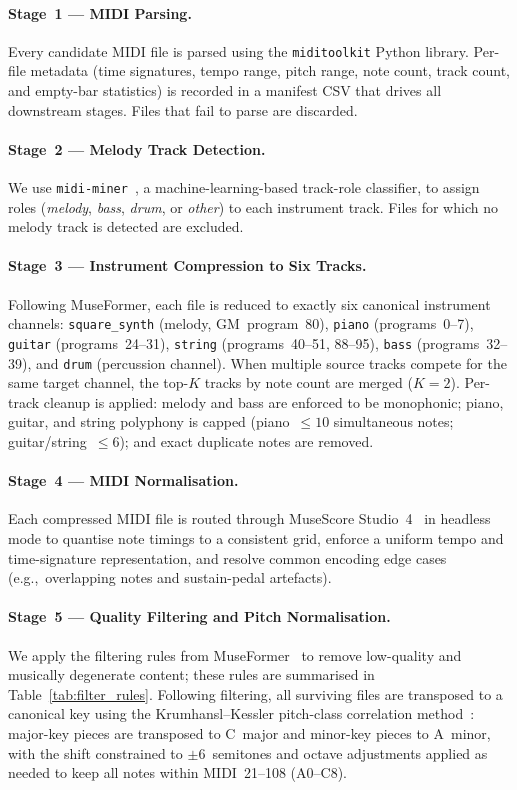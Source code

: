 \documentclass[conference]{IEEEtran}
\begin{document}
\paragraph{Stage~1 --- MIDI Parsing.}
Every candidate MIDI file is parsed using the \texttt{miditoolkit} Python library.
Per-file metadata (time signatures, tempo range, pitch range, note count, track count,
and empty-bar statistics) is recorded in a manifest CSV that drives all downstream
stages. Files that fail to parse are discarded.

\paragraph{Stage~2 --- Melody Track Detection.}
We use \texttt{midi-miner}~\cite{midiminer}, a machine-learning-based track-role
classifier, to assign roles (\emph{melody}, \emph{bass}, \emph{drum}, or
\emph{other}) to each instrument track.
Files for which no melody track is detected are excluded.

\paragraph{Stage~3 --- Instrument Compression to Six Tracks.}
Following MuseFormer, each file is reduced to exactly six canonical instrument
channels: \texttt{square\_synth} (melody, GM~program~80),
\texttt{piano} (programs~0--7), \texttt{guitar} (programs~24--31),
\texttt{string} (programs~40--51, 88--95), \texttt{bass} (programs~32--39),
and \texttt{drum} (percussion channel).
When multiple source tracks compete for the same target channel, the top-$K$ tracks
by note count are merged ($K{=}2$).
Per-track cleanup is applied: melody and bass are enforced to be monophonic; piano,
guitar, and string polyphony is capped (piano~$\leq 10$ simultaneous notes;
guitar/string~$\leq 6$); and exact duplicate notes are removed.

\paragraph{Stage~4 --- MIDI Normalisation.}
Each compressed MIDI file is routed through MuseScore Studio~4~\cite{musescore}
in headless mode to quantise note timings to a consistent grid, enforce a uniform
tempo and time-signature representation, and resolve common encoding edge cases
(e.g.,~overlapping notes and sustain-pedal artefacts).

\paragraph{Stage~5 --- Quality Filtering and Pitch Normalisation.}
We apply the filtering rules from MuseFormer~\cite{yu2022museformer} to remove
low-quality and musically degenerate content; these rules are summarised in
Table~\ref{tab:filter_rules}.
Following filtering, all surviving files are transposed to a canonical key using the
Krumhansl--Kessler pitch-class correlation method~\cite{krumhansl1990cognitive}:
major-key pieces are transposed to C~major and minor-key pieces to A~minor, with the
shift constrained to $\pm 6$~semitones and octave adjustments applied as needed to
keep all notes within MIDI~21--108 (A0--C8).
\end{document}
